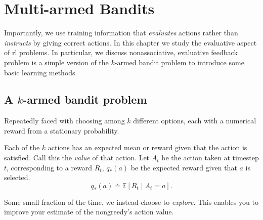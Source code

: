 \chapter
{Multi-armed Bandits}
Importantly, we use training information that \textit{evaluates }actions rather than \textit{instructs} by giving correct actions. In this chapter we study the evaluative aspect of rl problems. In particular, we discuss nonassociative, evaluative feedback problem is a simple version of the $k$-armed bandit problem to introduce some basic learning methods.
\section{A $k$-armed bandit problem}
Repeatedly faced with choosing among $k$ different options, each with a numerical reward from a stationary probability.

Each of the $k$ actions has an expected mean or reward given that the action is satisfied. Call this the \textit{value} of that action. Let $A_t$ be the action taken at timestep $t$, corresponding to a reward $R_t$, $q_*(a)$ be the expected reward given that $a$ is selected.
\[
    q_*(a) \doteq \mathbb{E}[R_t \mid A_t=a]
.\] 

Some small fraction of the time, we instead choose to \textit{explore}. This enables you to improve your estimate of the nongreedy's action value.

